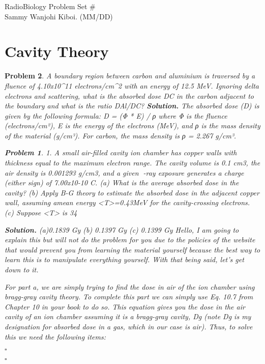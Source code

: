 \documentclass[12pt]{article}
\newtheorem{problem}{Problem}
\newenvironment{solution}[1][\it{Solution}]{\textbf{#1. } }{$\square$}
\begin{document}
\noindent RadioBiology \hfill Problem Set \#\\
Sammy Wanjohi Kiboi. (MM/DD)

\hrulefill

\section{Cavity Theory}
\begin{problem}
A boundary region between carbon and aluminium is traversed by a fluence of 4.10x10^11 electrons/cm^2 with an energy of 12.5 MeV. Ignoring delta electrons and scattering, what is the absorbed dose DC in the carbon adjacent to the boundary and what is the ratio DAl/DC?
\begin{solution}
The absorbed dose (D) is given by the following formula: D = (Φ * E) / ρ where Φ is the fluence (electrons/cm²), E is the energy of the electrons (MeV), and ρ is the mass density of the material (g/cm³). For carbon, the mass density is ρ = 2.267 g/cm³.

\newline
\begin{problem}
1. A small air-filled cavity ion chamber has copper walls with thickness equal to the maximum electron range. The cavity volume is 0.1 cm3, the air density is 0.001293 g/cm3, and a given -ray exposure generates a charge (either sign) of 7.00x10-10 C.
(a) What is the average absorbed dose in the cavity?
(b) Apply B-G theory to estimate the absorbed dose in the adjacent copper wall, assuming amean energy <T>=0.43MeV for the cavity-crossing electrons.
(c) Suppose <T> is 34%

\begin{solution}
(a)0.1839 Gy
(b) 0.1397 Gy
(c) 0.1399 Gy
Hello, I am going to explain this but will not do the problem for you due to the policies of the website that would prevent you from learning the material yourself because the best way to learn this is to manipulate everything yourself. With that being said, let's get down to it.

For part a, we are simply trying to find the dose in air of the ion chamber using bragg-gray cavity theory. To complete this part we can simply use Eq. 10.7 from Chapter 10 in your book to do so. This equation gives you the dose in the air cavity of an ion chamber assuming it is a bragg-gray cavity, Dg (note Dg is my designation for absorbed dose in a gas, which in our case is air). Thus, to solve this we need the following items:


\end{solution}
\end{problem}
\end{solution}
\end{problem}
\end{document}
